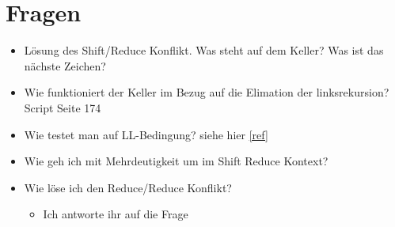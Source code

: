 \documentclass[
  ngerman
  ,12pt
  ,pdftex
]{article}
\begin{document}

\section{Fragen}
\begin{itemize}
  \item Lösung des Shift/Reduce Konflikt. Was steht auf dem Keller? Was ist das nächste Zeichen?
  \item Wie funktioniert der Keller im Bezug auf die Elimation der linksrekursion? Script Seite 174
  \item Wie testet man auf LL-Bedingung? siehe hier \ref{ref}
  \item Wie geh ich mit Mehrdeutigkeit um im Shift Reduce Kontext?
  \item Wie löse ich den Reduce/Reduce Konflikt?
  \begin{itemize}
    \item []  Ich antworte ihr auf die Frage  
  \end{itemize}
\end{itemize}
\end{document}
